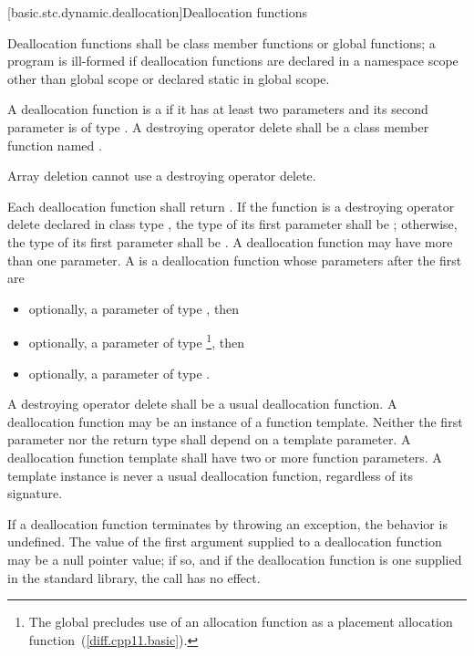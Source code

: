 [basic.stc.dynamic.deallocation]{Deallocation functions}

\pnum
{}%
Deallocation functions shall be class member functions or global
functions; a program is ill-formed if deallocation functions are
declared in a namespace scope other than global scope or declared static
in global scope.

\pnum
A deallocation function
is a 
if it has at least two parameters
and its second parameter
is of type .
A destroying operator delete
shall be a class member function named .
\begin{note}
Array deletion cannot use a destroying operator delete.
\end{note}

\pnum
{}%
Each deallocation function shall return .
If the function is a destroying operator delete
declared in class type ,
the type of its first parameter shall be ;
otherwise, the type of its first
parameter shall be . A deallocation function may have more
than one parameter.
%
A  is a deallocation function
whose parameters after the first are
\begin{itemize}
\item
optionally, a parameter of type , then
\item
optionally, a parameter of type %
\footnote{The global 
precludes use of an
allocation function  as a placement
allocation function~(\ref{diff.cpp11.basic}).}, then
\item
optionally, a parameter of type .
\end{itemize}
A destroying operator delete shall be a usual deallocation function.
A deallocation function may be an instance of a function
template. Neither the first parameter nor the return type shall depend
on a template parameter.
A deallocation
function template shall have two or more function parameters. A template
instance is never a usual deallocation function, regardless of its
signature.

\pnum
If a deallocation function terminates by throwing an exception, the behavior is undefined.
The value of the first argument supplied to a deallocation function may
be a null pointer value; if so, and if the deallocation function is one
supplied in the standard library, the call has no effect.

